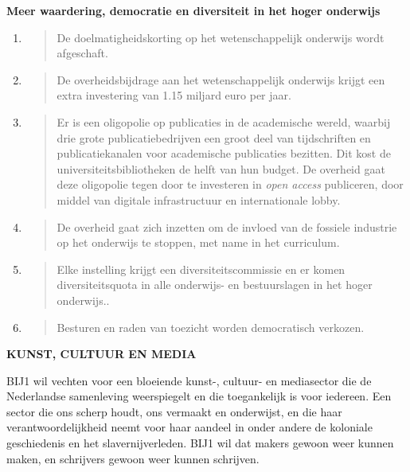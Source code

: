 \textbf{Meer waardering, democratie en diversiteit in het hoger
onderwijs}

\begin{enumerate}
\def\labelenumi{\arabic{enumi}.}
\item
  \begin{quote}
  De doelmatigheidskorting op het wetenschappelijk onderwijs wordt
  afgeschaft.
  \end{quote}
\item
  \begin{quote}
  De overheidsbijdrage aan het wetenschappelijk onderwijs krijgt een
  extra investering van 1.15 miljard euro per jaar.
  \end{quote}
\item
  \begin{quote}
  Er is een oligopolie op publicaties in de academische wereld, waarbij
  drie grote publicatiebedrijven een groot deel van tijdschriften en
  publicatiekanalen voor academische publicaties bezitten. Dit kost de
  universiteitsbibliotheken de helft van hun budget. De overheid gaat
  deze oligopolie tegen door te investeren in \emph{open access}
  publiceren, door middel van digitale infrastructuur en internationale
  lobby.
  \end{quote}
\item
  \begin{quote}
  De overheid gaat zich inzetten om de invloed van de fossiele industrie
  op het onderwijs te stoppen, met name in het curriculum.
  \end{quote}
\item
  \begin{quote}
  Elke instelling krijgt een diversiteitscommissie en er komen
  diversiteitsquota in alle onderwijs- en bestuurslagen in het hoger
  onderwijs..
  \end{quote}
\item
  \begin{quote}
  Besturen en raden van toezicht worden democratisch verkozen.
  \end{quote}
\end{enumerate}

\textbf{KUNST, CULTUUR EN MEDIA}

BIJ1 wil vechten voor een bloeiende kunst-, cultuur- en mediasector die
de Nederlandse samenleving weerspiegelt en die toegankelijk is voor
iedereen. Een sector die ons scherp houdt, ons vermaakt en onderwijst,
en die haar verantwoordelijkheid neemt voor haar aandeel in onder andere
de koloniale geschiedenis en het slavernijverleden. BIJ1 wil dat makers
gewoon weer kunnen maken, en schrijvers gewoon weer kunnen schrijven.

